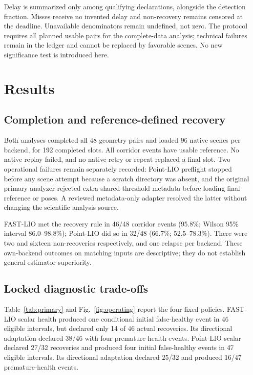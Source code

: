 \documentclass[conference]{IEEEtran}
\begin{document}
Delay is summarized only among qualifying declarations, alongside the
detection fraction. Misses receive no invented delay and non-recovery
remains censored at the deadline. Unavailable denominators remain undefined,
not zero. The protocol requires all planned usable pairs for the complete-data
analysis; technical failures remain in the ledger and cannot be replaced
by favorable scenes. No new significance test is introduced here.

\section{Results}
\subsection{Completion and reference-defined recovery}
Both analyses completed all 48 geometry pairs and loaded 96 native scenes
per backend, for 192 completed slots. All corridor events have usable reference.
No native replay failed, and no native retry or repeat replaced a final slot.
Two operational failures remain separately recorded: Point-LIO preflight
stopped before any scene attempt because a scratch directory was absent,
and the original primary analyzer rejected extra shared-threshold metadata
before loading final reference or poses. A reviewed metadata-only adapter
resolved the latter without changing the scientific analysis source.

FAST-LIO met the recovery rule in 46/48 corridor events (95.8\%; Wilson
95\% interval 86.0--98.8\%); Point-LIO did so in 32/48 (66.7\%; 52.5--78.3\%).
There were two and sixteen non-recoveries respectively, and one relapse per
backend. These own-backend outcomes on matching inputs are descriptive;
they do not establish general estimator superiority.

\subsection{Locked diagnostic trade-offs}
Table~\ref{tab:primary} and Fig.~\ref{fig:operating} report the four fixed policies. FAST-LIO scalar
health produced one conditional initial false-healthy event in 46 eligible
intervals, but declared only 14 of 46 actual recoveries. Its directional
adaptation declared 38/46 with four premature-health events. Point-LIO scalar
declared 27/32 recoveries and produced four initial false-healthy events in
47 eligible intervals. Its directional adaptation declared 25/32 and
produced 16/47 premature-health events.
\end{document}
